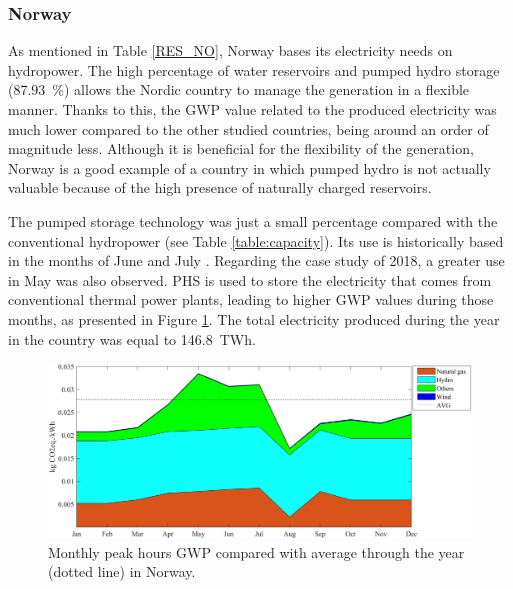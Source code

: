 {{ 

\subsubsection{Norway}
As mentioned in Table \ref{RES_NO}, Norway bases its electricity needs on hydropower. The high percentage of water reservoirs and pumped hydro storage {(87.93~\%)} allows the Nordic country to manage the generation in a flexible manner.  Thanks to this, the GWP value related to the produced electricity was much lower compared to the other studied countries, {being around an order of magnitude less}. Although it is beneficial for the flexibility of the generation, Norway is a good example of a country in which pumped hydro is not actually valuable because of the high presence of naturally charged reservoirs. 

The pumped storage technology was just a small percentage compared with the conventional hydropower (see Table \ref{table:capacity}). Its use is historically based in the months of June and July \cite{Kougias2017PumpedHorse}. Regarding the case study of 2018, a greater use in May was also observed. PHS is used to store the electricity that comes from conventional thermal power plants, leading to higher GWP values during those months, as presented in Figure \ref{GWP_NO}. The total electricity produced during the year in the country was equal to 146.8~TWh.

 \begin{table}[htbp]
\centering
\caption{Percentage of resources used during peak and off-peak hours in Norway \cite{Entso-eProduction}.}
\label{RES_NO} 
\end{table}


\begin{figure}[htbp]
	\centering
	\includegraphics[width=1\textwidth]{ChapterLCA/Images/GWP_plots/Norway_GWP.png}
	\caption{Monthly peak hours GWP compared with average through the year (dotted line) in Norway.}
	\label{GWP_NO}
\end{figure}

}}
